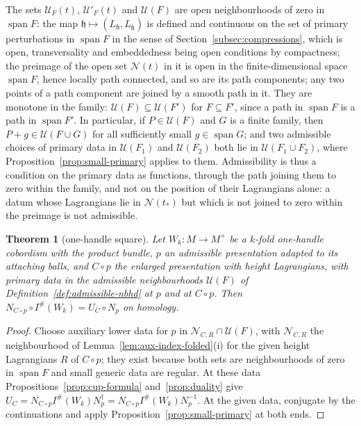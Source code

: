 \documentclass[11pt]{amsart}
\newtheorem{theorem}{Theorem}[section]
\theoremstyle{definition}
\theoremstyle{remark}
\theoremstyle{plain}
\numberwithin{equation}{section}
\newcommand{\Ish}{I^{\#}}
\begin{document}
The sets $\mathcal U_F(t)$, $\mathcal U'_F(t)$ and $\mathcal U(F)$ are open neighbourhoods of
zero in $\operatorname{span}F$: the map $\mathfrak h\mapsto(L_{\mathfrak h},L_{\bar{\mathfrak h}})$
is defined and continuous on the set of primary perturbations in $\operatorname{span}F$ in the
sense of Section~\ref{subsec:compressions}, which is open, transversality and embeddedness being
open conditions by compactness; the preimage of the open set $\mathcal N(t)$ in it is open in the
finite-dimensional space $\operatorname{span}F$, hence locally path connected, and so are its
path components; any two points of a path component are joined by a smooth path in it. They are
monotone in the family: $\mathcal U(F)\subseteq\mathcal U(F')$ for $F\subseteq F'$, since a
path in $\operatorname{span}F$ is a path in $\operatorname{span}F'$. In particular, if
$P\in\mathcal U(F)$ and $G$ is a finite family, then $P+g\in\mathcal U(F\cup G)$ for all
sufficiently small $g\in\operatorname{span}G$; and two admissible choices of primary data in
$\mathcal U(F_1)$ and $\mathcal U(F_2)$ both lie in $\mathcal U(F_1\cup F_2)$, where
Proposition~\ref{prop:small-primary} applies to them. Admissibility is thus a condition on the
primary data as functions, through the path joining them to zero within the family, and not on
the position of their Lagrangians alone: a datum whose Lagrangians lie in $\mathcal N(t_*)$ but
which is not joined to zero within the preimage is not admissible.


\begin{theorem}[one-handle square]\label{thm:one-handle}
Let $W_k\colon M\to M^+$ be a $k$-fold one-handle cobordism with the product bundle,
$p$ an admissible presentation adapted to its attaching balls, and $C\circ p$ the
enlarged presentation with height Lagrangians, with primary data in the admissible
neighbourhoods $\mathcal U(F)$ of Definition~\ref{def:admissible-nbhd} at $p$ and at
$C\circ p$. Then
$N_{C\circ p}\circ\Ish(W_k)=U_C\circ N_p$ on homology.
\end{theorem}

\begin{proof}
Choose auxiliary lower data for $p$ in $\mathcal N_{C,R}\cap\mathcal U(F)$, with
$\mathcal N_{C,R}$ the neighbourhood of Lemma~\ref{lem:aux-index-folded}(i) for the given height
Lagrangians $R$ of $C\circ p$; they exist because both sets are neighbourhoods of zero in
$\operatorname{span}F$ and small generic data are regular. At
these data Propositions~\ref{prop:cup-formula} and~\ref{prop:duality} give
$U_C=N_{C\circ p}\Ish(W_k)N^\dagger_p=N_{C\circ p}\Ish(W_k)N_p^{-1}$. At the given data,
conjugate by the continuations and apply Proposition~\ref{prop:small-primary} at
both ends.
\end{proof}
\end{document}
